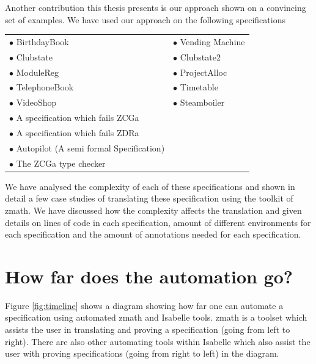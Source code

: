 Another contribution this thesis presents is our approach shown on a convincing set of examples. We have used our approach on the following specifications

\begin{tabular}{l l}
$\bullet$ BirthdayBook \cite{spiveyreferencemanual} & $\bullet$ Vending Machine \cite{pp} \\
$\bullet$ Clubstate \cite{essenceofz} & $\bullet$ Clubstate2 \cite{essenceofz} \\
$\bullet$ ModuleReg \cite{essenceofz} & $\bullet$ ProjectAlloc \cite{essenceofz} \\
$\bullet$ TelephoneBook & $\bullet$ Timetable \cite{essenceofz} \\
$\bullet$ VideoShop \cite{essenceofz} & $\bullet$ Steamboiler \cite{steamboilerslides} \\
$\bullet$ A specification which fails ZCGa & \\
$\bullet$ A specification which fails ZDRa & \\
$\bullet$ Autopilot (A semi formal Specification) \cite{Butler96} & \\
$\bullet$ The ZCGa type checker & \\
\end{tabular}

We have analysed the complexity of each of these specifications and shown in detail a few case studies of translating these specification using the toolkit of \gls{zmath}. We have discussed how the complexity affects the translation and given details on lines of code in each specification, amount of different environments for each specification and the amount of annotations needed for each specification.

\section{How far does the automation go?}

Figure \ref{fig:timeline} shows a diagram showing how far one can automate a specification using automated \gls{zmath} and Isabelle tools. \Gls{zmath} is a toolset which assists the user in translating and proving a specification (going from left to right). There are also other automating tools within Isabelle which also assist the user with proving specifications (going from right to left) in the diagram.

